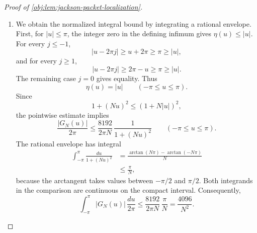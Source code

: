 \begin{proof}[Proof of \cref{obj:lem:jackson-packet-localization}]
\begin{enumerate}
If \(N\eta(u)\leq1\), then
\[
(1+N\eta(u))^2\leq4,
\qquad
|G_N(u)|\leq\frac2N
\leq\frac{8192}{N(1+N\eta(u))^2}.
\]
This case includes \(\eta(u)=0\).

Suppose instead that \(N\eta(u)>1\), so \(\eta(u)>0\). For every integer
\(j_0\), shifting the finite Fourier sum gives
\[
\sum_j a_{j+j_0}^{(\varsigma)}e^{iju}
=e^{-ij_0u}\mathcal F_N^{\varsigma}(u).
\]
Applying this with shifts one and two yields
\[
\sum_j(\delta^2a^{(\varsigma)})_je^{iju}
=(e^{-iu}-1)^2\mathcal F_N^{\varsigma}(u).
\]
Therefore,
\[
|e^{-iu}-1|^2\,|\mathcal F_N^{\varsigma}(u)|
\leq\sum_j|(\delta^2a^{(\varsigma)})_j|
\leq\frac{512}{N^3}.
\]
Periodicity and the elementary sine bound on \([-\pi/2,\pi/2]\) give
\[
|e^{-iu}-1|
=2|\sin(\upsilon(u)/2)|
\geq\frac2\pi|\upsilon(u)|
\geq\frac2\pi\eta(u)
\geq\frac{\eta(u)}2,
\]
where the last inequality uses \(\pi\leq4\). It follows that
\[
|\mathcal F_N^{\varsigma}(u)|
\leq\frac{2048}{N^3\eta(u)^2}.
\]
Applying this estimate at \(u\) and \(-u\) in the representation of \(G_N\) gives
\[
|G_N(u)|\leq\frac{2048}{N^3\eta(u)^2}.
\]
Finally, \(N\eta(u)>1\) implies
\[
(1+N\eta(u))^2\leq4(N\eta(u))^2,
\]
and hence
\[
|G_N(u)|
\leq\frac{2048}{N^3\eta(u)^2}
\leq\frac{8192}{N(1+N\eta(u))^2}.
\]
Together, the two cases establish
\[
|G_N(u)|
\leq\frac{8192}{N(1+N\|u\|_{\mathbb T})^2}
\qquad(u\in\mathbb R).
\]

\item We obtain the normalized integral bound by integrating a rational envelope. First, for \(|u|\leq\pi\), the integer zero in the defining infimum gives
\(\eta(u)\leq|u|\). For every \(j\leq-1\),
\[
|u-2\pi j|\geq u+2\pi\geq\pi\geq|u|,
\]
and for every \(j\geq1\),
\[
|u-2\pi j|\geq2\pi-u\geq\pi\geq|u|.
\]
The remaining case \(j=0\) gives equality. Thus
\[
\eta(u)=|u|\qquad(-\pi\leq u\leq\pi).
\]
Since
\[
1+(Nu)^2\leq(1+N|u|)^2,
\]
the pointwise estimate implies
\[
\frac{|G_N(u)|}{2\pi}
\leq
\frac{8192}{2\pi N}\,
\frac1{1+(Nu)^2}
\qquad(-\pi\leq u\leq\pi).
\]
The rational envelope has integral
\[
\begin{aligned}
\int_{-\pi}^{\pi}\frac{du}{1+(Nu)^2}
&=\frac{\arctan(N\pi)-\arctan(-N\pi)}N\\
&\leq\frac\pi N,
\end{aligned}
\]
because the arctangent takes values between \(-\pi/2\) and \(\pi/2\).
Both integrands in the comparison are continuous on the compact interval.
Consequently,
\[
\int_{-\pi}^{\pi}|G_N(u)|\,\frac{du}{2\pi}
\leq
\frac{8192}{2\pi N}\,\frac\pi N
=\frac{4096}{N^2}.
\]


\end{enumerate}
\end{proof}
